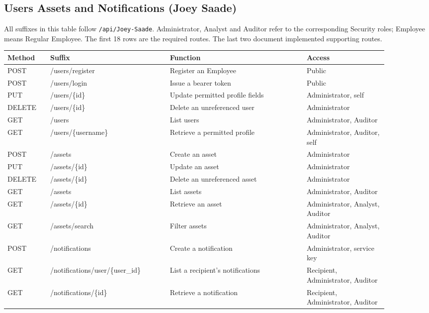 \subsection{Users Assets and Notifications (Joey Saade)}
All suffixes in this table follow \texttt{/api/Joey-Saade}. Administrator, Analyst and Auditor refer to the corresponding Security roles; Employee means Regular Employee. The first 18 rows are the required routes. The last two document implemented supporting routes.

\begin{small}
\begin{longtable}{>{\raggedright\arraybackslash}p{0.10\linewidth}>{\raggedright\arraybackslash}p{0.28\linewidth}>{\raggedright\arraybackslash}p{0.32\linewidth}>{\raggedright\arraybackslash}p{0.19\linewidth}}
\toprule
\textbf{Method} & \textbf{Suffix} & \textbf{Function} & \textbf{Access} \\
\midrule
\endhead
POST & /users/register & Register an Employee & Public \\
POST & /users/login & Issue a bearer token & Public \\
PUT & /users/\{id\} & Update permitted profile fields & Administrator, self \\
DELETE & /users/\{id\} & Delete an unreferenced user & Administrator \\
GET & /users & List users & Administrator, Auditor \\
GET & /users/\{username\} & Retrieve a permitted profile & Administrator, Auditor, self \\
POST & /assets & Create an asset & Administrator \\
PUT & /assets/\{id\} & Update an asset & Administrator \\
DELETE & /assets/\{id\} & Delete an unreferenced asset & Administrator \\
GET & /assets & List assets & Administrator, Auditor \\
GET & /assets/\{id\} & Retrieve an asset & Administrator, Analyst, Auditor \\
GET & /assets/search & Filter assets & Administrator, Analyst, Auditor \\
POST & /notifications & Create a notification & Administrator, service key \\
GET & /notifications/user/\{user\_id\} & List a recipient's notifications & Recipient, Administrator, Auditor \\
GET & /notifications/\{id\} & Retrieve a notification & Recipient, Administrator, Auditor \\

\end{longtable}
\end{small}
